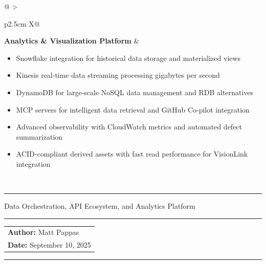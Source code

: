 \documentclass[12pt, a4paper]{article} %
\newcommand{\theothertitle}{Data Orchestration, API Ecosystem, and Analytics Platform}
\begin{document}
\begin{table}[h!]
\begin{tabularx}{\textwidth}{@{}
  >{\raggedright\arraybackslash\relax}p{2.5cm}
  X@{}}
\textbf{Analytics \& Visualization Platform} &
\begin{itemize}[leftmargin=*, nosep]
  \item Snowflake integration for historical data storage and materialized views
  \item Kinesis real-time data streaming processing gigabytes per second
  \item DynamoDB for large-scale NoSQL data management and RDB alternatives
  \item MCP servers for intelligent data retrieval and GitHub Co-pilot integration
  \item Advanced observability with CloudWatch metrics and automated defect summarization
  \item ACID-compliant derived assets with fast read performance for VisionLink integration
\end{itemize} \\

\bottomrule
\end{tabularx}
\caption{Caterpillar Helios: Next-Generation Data Orchestration and Analytics Platform}
\label{tab:solutions_overview}
\end{table}

\thispagestyle{empty}

\newpage

\begin{center}
    \noindent\rule{\linewidth}{2pt} %

    \vspace{0.5em}

    {\LARGE \bfseries \MakeUppercase{\thetitle} \par}

    \vspace{0.25em}

    {\small \theothertitle}

    \vspace{0.5em}
    
    \noindent\rule{\linewidth}{2pt} %

    \vspace{0.5em}

    \begin{tabular}{@{} l @{}}
        \textbf{Author:} Matt Pappas \\ [6pt]
        \textbf{Date:} September 10, 2025
    \end{tabular}

    \vspace{0.5em}

    \noindent\rule{\linewidth}{2pt} %
\end{center}
\end{document}
